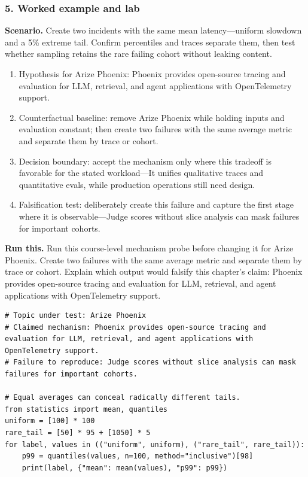 \subsubsection*{5. Worked example and lab}
\textbf{Scenario.} Create two incidents with the same mean latency—uniform slowdown and a 5\% extreme tail. Confirm percentiles and traces separate them, then test whether sampling retains the rare failing cohort without leaking content.
\begin{enumerate}
\item Hypothesis for Arize Phoenix: Phoenix provides open-source tracing and evaluation for LLM, retrieval, and agent applications with OpenTelemetry support.
\item Counterfactual baseline: remove Arize Phoenix while holding inputs and evaluation constant; then create two failures with the same average metric and separate them by trace or cohort.
\item Decision boundary: accept the mechanism only where this tradeoff is favorable for the stated workload—It unifies qualitative traces and quantitative evals, while production operations still need design.
\item Falsification test: deliberately create this failure and capture the first stage where it is observable—Judge scores without slice analysis can mask failures for important cohorts.
\end{enumerate}
\textbf{Run this.} Run this course-level mechanism probe before changing it for Arize Phoenix. Create two failures with the same average metric and separate them by trace or cohort. Explain which output would falsify this chapter's claim: Phoenix provides open-source tracing and evaluation for LLM, retrieval, and agent applications with OpenTelemetry support.
\begin{Verbatim}[fontsize=\scriptsize]
# Topic under test: Arize Phoenix
# Claimed mechanism: Phoenix provides open-source tracing and evaluation for LLM, retrieval, and agent applications with OpenTelemetry support.
# Failure to reproduce: Judge scores without slice analysis can mask failures for important cohorts.

# Equal averages can conceal radically different tails.
from statistics import mean, quantiles
uniform = [100] * 100
rare_tail = [50] * 95 + [1050] * 5
for label, values in (("uniform", uniform), ("rare_tail", rare_tail)):
    p99 = quantiles(values, n=100, method="inclusive")[98]
    print(label, {"mean": mean(values), "p99": p99})
\end{Verbatim}

